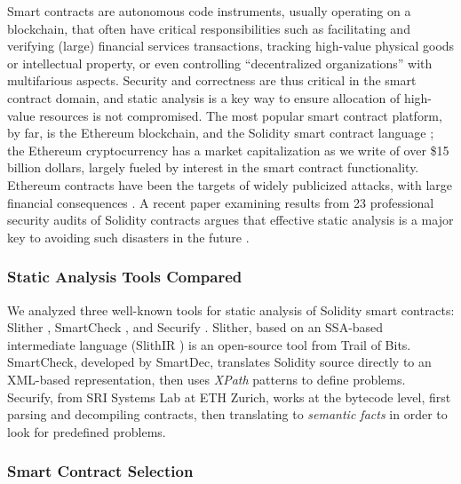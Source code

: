 Smart contracts are autonomous code instruments, usually operating on a blockchain, that often have critical responsibilities such as facilitating and verifying (large) financial services transactions, tracking high-value physical goods or intellectual property, or even controlling ``decentralized organizations'' with multifarious aspects.  Security and correctness are thus critical in the smart contract domain, and static analysis is a key way to ensure allocation of high-value resources is not compromised.  The most popular smart contract platform, by far, is the Ethereum blockchain, and the Solidity smart contract language \cite{buterin2013whitepaper,wood2014yellow}; the Ethereum cryptocurrency has a market capitalization as we write of over \$15 billion dollars, largely fueled by interest in the smart contract functionality.  Ethereum contracts have been the targets of widely publicized attacks, with large financial consequences  \cite{spank,DAO}.   A recent paper examining results from 23 professional security audits of Solidity contracts argues that effective static analysis is a major key to avoiding such disasters in the future \cite{FC20}.

\subsubsection{Static Analysis Tools Compared}

We analyzed three well-known tools for static analysis of Solidity smart contracts: Slither \cite{slither}, SmartCheck \cite{smartcheck}, and Securify \cite{Securify}.  Slither, based on an SSA-based intermediate language (SlithIR \cite{slither}) is an open-source tool from Trail of Bits.  SmartCheck, developed by SmartDec, translates Solidity source directly to an XML-based representation, then uses \emph{XPath} patterns to define problems.  Securify, from SRI Systems Lab at ETH Zurich, works at the bytecode level, first parsing and decompiling contracts, then translating to \emph{semantic facts} in order to look for predefined problems.

\subsubsection{Smart Contract Selection}

